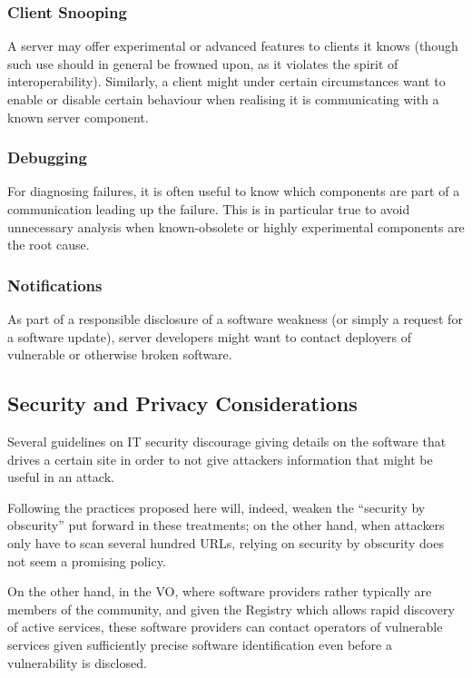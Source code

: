 \documentclass[11pt,a4paper]{ivoa}
\begin{document}
\subsubsection{Client Snooping}

A server may offer experimental or advanced features to clients it knows
(though such use should in general be frowned upon, as it violates the
spirit of interoperability).  Similarly, a client might under certain
circumstances want to enable or disable certain behaviour when realising
it is communicating with a known server component.

\subsubsection{Debugging}

For diagnosing failures, it is often useful to know which components are
part of a communication leading up the failure.  This is in particular
true to avoid unnecessary analysis when known-obsolete or highly
experimental components are the root cause.

\subsubsection{Notifications}

As part of a responsible disclosure of a software weakness (or simply a
request for a software update), server developers might want to contact
deployers of vulnerable or otherwise broken software.

\subsection{Security and Privacy Considerations}

Several guidelines on IT security discourage giving details on the
software that drives a certain site in order to not give attackers
information that might be useful in an attack.

Following the practices proposed here will, indeed, weaken the
``security by obscurity'' put forward in these treatments; on the other
hand, when attackers only have to scan several hundred URLs,
relying on security by obscurity does not seem a promising policy.

On the other
hand, in the VO, where software providers rather typically are members
of the community, and given the Registry which allows rapid discovery of
active services, these software providers can contact
operators of vulnerable services given sufficiently precise software
identification even before a vulnerability is disclosed.
\end{document}
